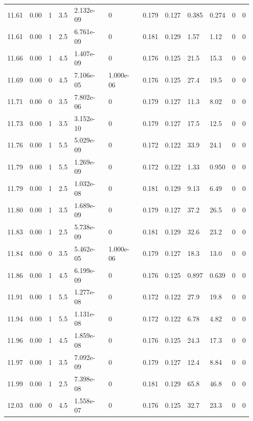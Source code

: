 \documentclass[preview]{standalone}
\begin{document}
{{{{{{{{{{{\begin{tabular}{L{1.2cm}C{1.2cm} C{0.3cm}C{0.5cm} C{1.4cm}C{1.4cm} C{1.4cm}C{1.4cm} C{1.6cm}C{1.6cm} C{1.6cm}C{1.6cm}}
  11.61  &  0.00  & 1     & 3.5 &  2.132e-09  & 0  &  0.179&   0.127& 0.385 & 0.274   &  0 & 0  \\ 
  11.61  &  0.00  & 1     & 2.5 &  6.761e-09  & 0  &  0.181&   0.129& 1.57 & 1.12   &  0 & 0  \\ 
  11.66  &  0.00  & 1     & 4.5 &  1.407e-09  & 0  &  0.176&   0.125& 21.5 & 15.3   &  0 & 0  \\ 
  11.69  &  0.00  & 0     & 4.5 &  7.106e-05  & 1.000e-06  &  0.176&   0.125& 27.4 & 19.5   &  0 & 0  \\ 
  11.71  &  0.00  & 0     & 3.5 &  7.802e-06  & 0  &  0.179&   0.127& 11.3 & 8.02   &  0 & 0  \\ 
  11.73  &  0.00  & 1     & 3.5 &  3.152e-10  & 0  &  0.179&   0.127& 17.5 & 12.5   &  0 & 0  \\ 
  11.76  &  0.00  & 1     & 5.5 &  5.029e-09  & 0  &  0.172&   0.122& 33.9 & 24.1   &  0 & 0  \\ 
  11.79  &  0.00  & 1     & 5.5 &  1.269e-09  & 0  &  0.172&   0.122& 1.33 & 0.950   &  0 & 0  \\ 
  11.79  &  0.00  & 1     & 2.5 &  1.032e-08  & 0  &  0.181&   0.129& 9.13 & 6.49   &  0 & 0  \\ 
  11.80  &  0.00  & 1     & 3.5 &  1.689e-09  & 0  &  0.179&   0.127& 37.2 & 26.5   &  0 & 0  \\ 
  11.83  &  0.00  & 1     & 2.5 &  5.738e-09  & 0  &  0.181&   0.129& 32.6 & 23.2   &  0 & 0  \\ 
  11.84  &  0.00  & 0     & 3.5 &  5.462e-05  & 1.000e-06  &  0.179&   0.127& 18.3 & 13.0   &  0 & 0  \\ 
  11.86  &  0.00  & 1     & 4.5 &  6.199e-09  & 0  &  0.176&   0.125& 0.897 & 0.639   &  0 & 0  \\ 
  11.91  &  0.00  & 1     & 5.5 &  1.277e-08  & 0  &  0.172&   0.122& 27.9 & 19.8   &  0 & 0  \\ 
  11.94  &  0.00  & 1     & 5.5 &  1.131e-08  & 0  &  0.172&   0.122& 6.78 & 4.82   &  0 & 0  \\ 
  11.96  &  0.00  & 1     & 4.5 &  1.859e-08  & 0  &  0.176&   0.125& 24.3 & 17.3   &  0 & 0  \\ 
  11.97  &  0.00  & 1     & 3.5 &  7.092e-09  & 0  &  0.179&   0.127& 12.4 & 8.84   &  0 & 0  \\ 
  11.99  &  0.00  & 1     & 2.5 &  7.398e-08  & 0  &  0.181&   0.129& 65.8 & 46.8   &  0 & 0  \\ 
  12.03  &  0.00  & 0     & 4.5 &  1.558e-07  & 0  &  0.176&   0.125& 32.7 & 23.3   &  0 & 0  \\ 

\end{tabular}}}}}}}}}}}}
\end{document}
